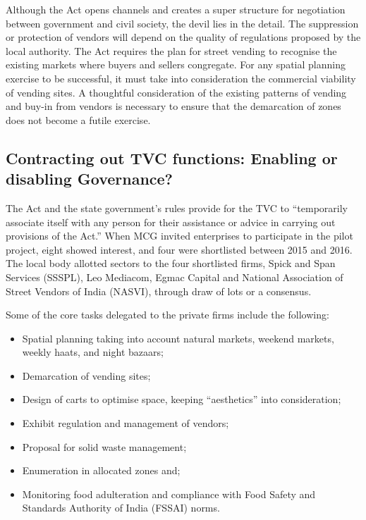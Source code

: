 \documentclass[a4paper, 12pt, twoside]{article}
\begin{document}
{{Although the Act opens channels and creates a super structure for negotiation between government and civil society, the devil lies in the detail. The suppression or protection of vendors will depend on the quality of regulations proposed by the local authority. The Act requires the plan for street vending to recognise the existing markets where buyers and sellers congregate. For any spatial planning exercise to be successful, it must take into consideration the commercial viability of vending sites. A thoughtful consideration of the existing patterns of vending and buy-in from vendors is necessary to ensure that the demarcation of zones does not become a futile exercise.


\subsection*{Contracting out TVC functions: Enabling or disabling Governance?}

The Act and the state government’s rules provide for the TVC to “temporarily associate itself with any person for their assistance or advice in carrying out provisions of the Act.” When MCG invited enterprises to participate in the pilot project, eight showed interest, and four were shortlisted between 2015 and 2016. The local body allotted sectors to the four shortlisted firms,  Spick and Span Services (SSSPL), Leo Mediacom, Egmac Capital and National Association of Street Vendors of India (NASVI), through draw of lots or a consensus.

Some of the core tasks delegated to the private firms include the following:
\begin{itemize}
\item Spatial planning taking into account natural markets, weekend markets, weekly haats, and night bazaars;
\item Demarcation of vending sites;
\item Design of carts to optimise space, keeping “aesthetics” into consideration;
\item Exhibit regulation and management of vendors;
\item Proposal for solid waste management;
\item Enumeration in allocated zones and;
\item Monitoring food adulteration and compliance with Food Safety and Standards Authority of India (FSSAI) norms.
\end{itemize}

}}
\end{document}
